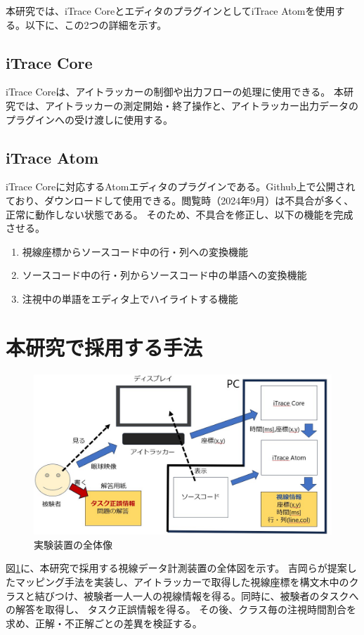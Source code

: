 \documentclass[paper=a4paper,fontsize=11pt]{jlreq}
\begin{document}
    本研究では、iTrace CoreとエディタのプラグインとしてiTrace Atomを使用する。以下に、この2つの詳細を示す。

    \subsection{iTrace Core}
      iTrace Coreは、アイトラッカーの制御や出力フローの処理に使用できる。
      本研究では、アイトラッカーの測定開始・終了操作と、アイトラッカー出力データのプラグインへの受け渡しに使用する。

    \subsection{iTrace Atom}
      iTrace Coreに対応するAtomエディタのプラグインである。Github上で公開されており、ダウンロードして使用できる。閲覧時（2024年9月）は不具合が多く、正常に動作しない状態である。
      そのため、不具合を修正し、以下の機能を完成させる。
      \begin{enumerate}
        \item 視線座標からソースコード中の行・列への変換機能
        \item ソースコード中の行・列からソースコード中の単語への変換機能
        \item 注視中の単語をエディタ上でハイライトする機能
      \end{enumerate}
  \clearpage

  \section{本研究で採用する手法}
    \begin{figure}[htbp]
      \centering
      \includegraphics[width=0.8\linewidth]{実験装置全体図.jpg}
      \caption{実験装置の全体像}
      \label{実験装置全体図}
    \end{figure}
    \FloatBarrier

    図\ref{実験装置全体図}に、本研究で採用する視線データ計測装置の全体図を示す。
    吉岡らが提案したマッピング手法を実装し、アイトラッカーで取得した視線座標を構文木中のクラスと結びつけ、被験者一人一人の視線情報を得る。同時に、被験者のタスクへの解答を取得し、
    タスク正誤情報を得る。
    その後、クラス毎の注視時間割合を求め、正解・不正解ごとの差異を検証する。
  \clearpage
\end{document}
